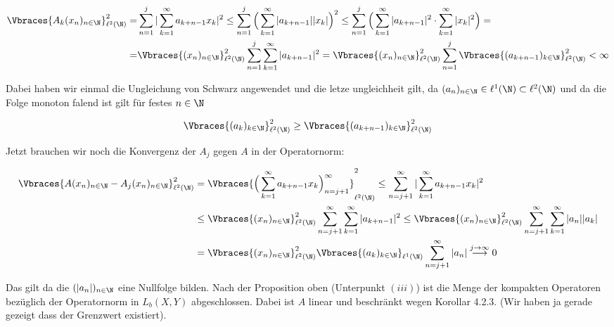 \begin{solution}
\begin{align*}
  \Vbraces{A_k(x_n)_{n\in\N}}_{\ell^2(\N)}^2 =&
  \sum_{n=1}^j |\sum_{k=1}^\infty a_{k+n-1}x_k|^2  \leq
  \sum_{n=1}^j \Big( \sum_{k=1}^\infty |a_{k+n-1}| |x_k|\Big)^2 \leq
  \sum_{n=1}^j \Big( \sum_{k=1}^\infty |a_{k+n-1}|^2 \cdot \sum_{k=1}^\infty |x_k|^2\Big) = \\
  =& \Vbraces{(x_n)_{n \in \N}}_{\ell^2(\N)}^2 \sum_{n=1}^j \sum_{k=1}^\infty |a_{k+n-1}|^2 =
  \Vbraces{(x_n)_{n \in \N}}_{\ell^2(\N)}^2 \sum_{n=1}^j \Vbraces{(a_{k+n-1})_{k \in \N}}_{\ell^2(\N)}^2
  < \infty
\end{align*}

Dabei haben wir einmal die Ungleichung von Schwarz angewendet und die letze ungleichheit gilt, da
$(a_n)_{n\in \N} \in \ell^1(\N) \subset \ell^2(\N)$ und da die Folge monoton falend ist gilt
für festes $n \in \N$

\begin{align*}
  \Vbraces{(a_k)_{k\in \N}}_{\ell^2(\N)}^2 \geq \Vbraces{(a_{k+n-1})_{k \in \N}}_{\ell^2(\N)}^2
\end{align*}

Jetzt brauchen wir noch die Konvergenz der $A_j$ gegen $A$ in der Operatornorm:

\begin{align*}
  \Vbraces{A(x_n)_{n \in \N}- A_j(x_n)_{n \in \N}}_{\ell^2(\N)}^2 &=
  \Vbraces{\Big(\sum_{k=1}^\infty a_{k+n-1} x_k\Big)_{n=j+1}^\infty}_{\ell^2(\N)}^2
  \leq \sum_{n=j+1}^\infty |\sum_{k=1}^\infty a_{k+n-1} x_k|^2 \\
  &\leq \Vbraces{(x_n)_{n \in \N}}_{\ell^2(\N)}^2 \sum_{n=j+1}^\infty \sum_{k=1}^\infty |a_{k+n-1}|^2
  \leq \Vbraces{(x_n)_{n \in \N}}_{\ell^2(\N)}^2 \sum_{n=j+1}^\infty \sum_{k=1}^\infty |a_n||a_k| \\
  &= \Vbraces{(x_n)_{n \in \N}}_{\ell^2(\N)}^2 \Vbraces{(a_k)_{k \in \N}}_{\ell^1(\N)} \sum_{n=j+1}^\infty |a_n|
  \stackrel{j \rightarrow \infty}{\longrightarrow} 0
\end{align*}

Das gilt da die $(|a_n|)_{n \in \N}$ eine Nullfolge bilden. Nach der Proposition oben
(Unterpunkt $(iii)$) ist die Menge der kompakten Operatoren bezüglich der Operatornorm in
$L_b(X,Y)$ abgeschlossen. Dabei ist $A$ linear und beschränkt wegen Korollar 4.2.3. (Wir haben
ja gerade gezeigt dass der Grenzwert existiert).


\end{solution}
